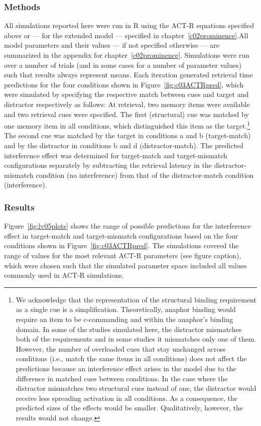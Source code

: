 \documentclass{cambridge7A}\usepackage[]{graphicx}\usepackage[]{color}
\newcommand{\R}{\textsf{R}}
\begin{document}
\subsubsection{Methods}
\label{sec:generalmethods}
All simulations reported here were run in \R{} \citep{R2016} using the ACT-R equations specified above or --- for the extended model --- specified in chapter~\ref{c02prominence}.All model parameters and their values --- if not specified otherwise --- are summarized in the appendix for chapter~\ref{c02prominence}. Simulations were run over a number of trials (and in some cases for a number of parameter values) such that results always represent means. Each iteration generated retrieval time predictions for the four conditions shown in Figure~\ref{fig:c03ACTRpred}, which were simulated by specifying the respective match between cues and target and distractor respectively as follows: 
At retrieval, two memory items were available and two retrieval cues were specified. The first (structural) cue was matched by one memory item in all conditions, which distinguished this item as the target.\footnote{We acknowledge that the representation of the structural binding requirement as a single cue is a simplification. Theoretically, anaphor binding would require an item to be c-commanding and within the anaphor's binding domain. In some of the studies simulated here, the distractor mismatches both of the requirements and in some studies it mismatches only one of them. 
	However, the number of overloaded cues that stay unchanged across conditions (i.e., match the same items in all conditions) does not affect the predictions because an interference effect arises in the model due to the difference in matched cues between conditions. In the case where the distractor mismatches two structural cues instead of one, the distractor would receive less spreading activation in all conditions. As a consequence, the predicted sizes of the effects would be smaller. Qualitatively, however, the results would not change.}
The second cue was matched by the target in conditions a and b (target-match) and by the distractor in conditions b and d (distractor-match).
The predicted interference effect was determined for target-match and target-mismatch configurations separately by subtracting the retrieval latency in the distractor-mismatch condition (no interference) from that of the distractor-match condition (interference).  


\subsubsection{Results}
Figure~\ref{fig:lv05plots} shows the range of possible predictions for the interference effect in target-match and target-mismatch configurations based on the four conditions shown in Figure~\ref{fig:c03ACTRpred}.
The simulations covered the range of values for the most relevant ACT-R parameters (see figure caption), which were chosen such that the simulated parameter space included all values commonly used in ACT-R simulations.
\end{document}
